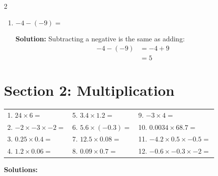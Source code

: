 \documentclass[12pt,a4paper]{article}
\begin{document}
\begin{multicols}{2}
\begin{enumerate}
    \item $-4 - (-9) =$
    
    \textbf{Solution:} Subtracting a negative is the same as adding:
    \begin{align*}
        -4 - (-9) &= -4 + 9 \\
        &= 5
    \end{align*}
\end{enumerate}
\end{multicols}

\section*{Section 2: Multiplication}

\begin{center}
\begin{tabular}{p{} p{} p{}}
1. $24 \times 6 =$ & 
5. $3.4 \times 1.2 =$ & 
9. $-3 \times 4 =$ \\

2. $-2 \times -3 \times -2 =$ & 
6. $5.6 \times (-0.3) =$ & 
10. $0.0034 \times 68.7 =$ \\

3. $0.25 \times 0.4 =$ & 
7. $12.5 \times 0.08 =$ & 
11. $-4.2 \times 0.5 \times -0.5 =$ \\

4. $1.2 \times 0.06 =$ & 
8. $0.09 \times 0.7 =$ & 
12. $-0.6 \times -0.3 \times -2 =$ \\
\end{tabular}
\end{center}

\textbf{Solutions:}
\end{document}

